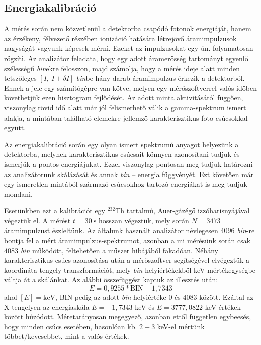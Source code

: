 \begin{multicols}{2}
\section{Energiakalibráció}
A mérés során nem közvetlenül a detektorba csapódó fotonok energiáját, hanem az érzékeny, félvezető részében ionizáció hatására létrejövő áramimpulzusok nagyságát vagyunk képesek mérni. Ezeket az impulzusokat egy ún.  folyamatosan rögzíti. Az analizátor feladata, hogy egy adott áramerősség tartományt egyenlő szélességű \emph{bin}ekre felosszon, majd számolja, hogy a mérés ideje alatt minden tetszőleges $\left[ I,\ I + \delta I \right]$ \emph{bin}be hány darab áramimpulzus érkezik a detektorból. Ennek a jele egy számítógépre van kötve, melyen egy mérőszoftverrel valós időben követhetjük ezen hisztogram fejlődését. Az adott minta aktivitásától függően, viszonylag rövid idő alatt már jól felismerhető válik a gamma-spektrum ismert alakja, a mintában található elemekre jellemző karakterisztikus foto-csúcsokkal együtt. \par
Az energiakalibráció során egy olyan ismert spektrumú anyagot helyezünk a detektorba, melynek karakterisztikus csúcsait könnyen azonosítani tudjuk és ismerjük a pontos energiájukat. Ezzel viszonylag pontosan meg tudjuk határozni az analizátorunk skálázását és annak \emph{bin} -- energia függvényét. Ezt követően már egy ismeretlen mintából származó csúcsokhoz tartozó energiákat is meg tudjuk mondani. \par
Esetünkben ezt a kalibrációt egy $^{232}$Th tartalmú, Auer-gázégő izzóharisnyájával végeztük el. A mérést $t = 30\ \text{s}$ hosszan végeztük, mely során $N = 3473$ áramimpulzust észleltünk. Az általunk használt analizátor névlegesen $4096$ \emph{bin}-re bontja fel a mért áramimpulzus-spektrumot, azonban a mi mérésünk során csak $4083$ \emph{bin} működött, feltehetően a műszer hibájából fakadóan. Néhány karakterisztikus csúcs azonosítása után a mérőszoftver segítségével elvégeztük a koordináta-tengely transzformációt, mely \emph{bin} helyiértékekből keV mértékegységbe váltja át a skálánkat. Az alábbi összefüggést kaptuk az illesztés után:
\begin{equation}
    E
    =
    0,9255 * \text{BIN} - 1,7343
\end{equation}
ahol $\left[ E \right] = \text{keV}$, BIN pedig az adott \emph{bin} helyiértéke $0$ és $4083$ között. Ezáltal az X-tengelyen az energiaskála $E = -1,7343$ keV és $E = 3777,0822$ keV értékek között húzódott. Méretarányosan megegyező, azonban ettől független egybeesés, hogy minden csúcs esetében, hasonlóan kb. $2-3$ keV-el mértünk többet/kevesebbet, mint a valós értékek.



\end{multicols}
